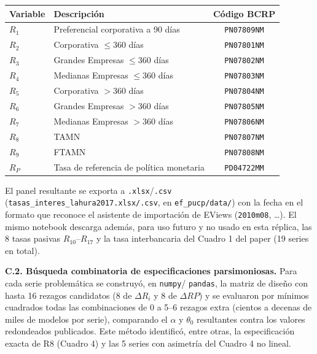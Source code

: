 \documentclass[12pt, letterpaper]{article}
\begin{document}
\begin{center}
\small
\begin{tabular}{llc}
\toprule
Variable & Descripción & Código BCRP \\
\midrule
$R_1$   & Preferencial corporativa a 90 días      & \texttt{PN07809NM} \\
$R_2$   & Corporativa $\le$360 días                & \texttt{PN07801NM} \\
$R_3$   & Grandes Empresas $\le$360 días            & \texttt{PN07802NM} \\
$R_4$   & Medianas Empresas $\le$360 días           & \texttt{PN07803NM} \\
$R_5$   & Corporativa $>$360 días                   & \texttt{PN07804NM} \\
$R_6$   & Grandes Empresas $>$360 días               & \texttt{PN07805NM} \\
$R_7$   & Medianas Empresas $>$360 días              & \texttt{PN07806NM} \\
$R_8$   & TAMN                                        & \texttt{PN07807NM} \\
$R_9$   & FTAMN                                       & \texttt{PN07808NM} \\
$R_P$   & Tasa de referencia de política monetaria   & \texttt{PD04722MM} \\
\bottomrule
\end{tabular}
\end{center}

El panel resultante se exporta a \texttt{.xlsx}/\texttt{.csv}
(\texttt{tasas\_interes\_lahura2017.xlsx/.csv}, en
\texttt{ef\_pucp/data/}) con la fecha en el formato que reconoce el
asistente de importación de EViews (\texttt{2010m08}, \ldots). El
mismo notebook descarga además, para uso futuro y no usado en esta
réplica, las 8 tasas pasivas $R_{10}$--$R_{17}$ y la tasa interbancaria
del Cuadro 1 del paper (19 series en total).

\textbf{C.2. Búsqueda combinatoria de especificaciones parsimoniosas.}
Para cada serie problemática se construyó, en \texttt{numpy}/
\texttt{pandas}, la matriz de diseño con hasta 16 rezagos candidatos
(8 de $\Delta R_i$ y 8 de $\Delta RP$) y se evaluaron por mínimos
cuadrados todas las combinaciones de 0 a 5--6 rezagos extra (cientos a
decenas de miles de modelos por serie), comparando el $\alpha$ y
$\theta_0$ resultantes contra los valores redondeados publicados. Este
método identificó, entre otras, la especificación exacta de R8 (Cuadro
4) y las 5 series con asimetría del Cuadro 4 no lineal.
\end{document}
